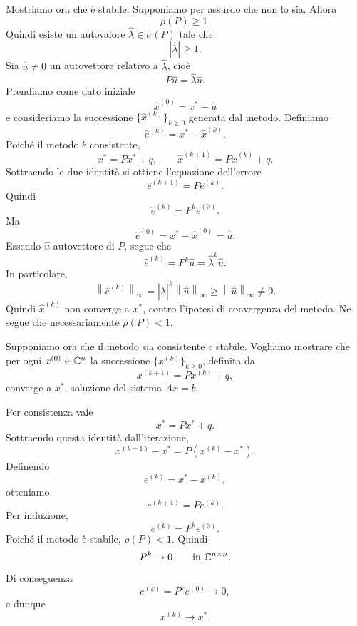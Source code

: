\documentclass[a4paper]{article}
\newcommand{\norm}[1]{\left\lVert#1\right\rVert}
\begin{document}
\begin{snippetproof}{}
\begin{iffproof}
        Mostriamo ora che è stabile. Supponiamo per assurdo che non lo sia. Allora
        \[
            \rho(P)\geq 1.
        \]
        Quindi esiste un autovalore \(\widehat{\lambda}\in\sigma(P)\) tale che
        \[
            |\widehat{\lambda}|\geq 1.
        \]
        Sia \(\widehat{u}\neq 0\) un autovettore relativo a \(\widehat{\lambda}\), cioè
        \[
            P\widehat{u}=\widehat{\lambda}\widehat{u}.
        \]
        Prendiamo come dato iniziale
        \[
            \widehat{x}^{(0)}=x^\ast-\widehat{u}
        \]
        e consideriamo la successione \(\{\widehat{x}^{(k)}\}_{k\geq 0}\) generata dal metodo. Definiamo
        \[
            \widehat{e}^{(k)}=x^\ast-\widehat{x}^{(k)}.
        \]
        Poiché il metodo è consistente,
        \[
            x^\ast=Px^\ast+q,
            \qquad
            \widehat{x}^{(k+1)}=P\widehat{x}^{(k)}+q.
        \]
        Sottraendo le due identità si ottiene l'equazione dell'errore
        \[
            \widehat{e}^{(k+1)}=P\widehat{e}^{(k)}.
        \]
        Quindi
        \[
            \widehat{e}^{(k)}
            =
            P^k\widehat{e}^{(0)}.
        \]
        Ma
        \[
            \widehat{e}^{(0)}
            =
            x^\ast-\widehat{x}^{(0)}
            =
            \widehat{u}.
        \]
        Essendo \(\widehat{u}\) autovettore di \(P\), segue che
        \[
            \widehat{e}^{(k)}
            =
            P^k\widehat{u}
            =
            \widehat{\lambda}^k\widehat{u}.
        \]
        In particolare,
        \[
            \norm{\widehat{e}^{(k)}}_\infty
            =
            {|\widehat{\lambda}|}^k\norm{\widehat{u}}_\infty
            \geq
            \norm{\widehat{u}}_\infty
            \neq 0.
        \]
        Quindi \(\widehat{x}^{(k)}\) non converge a \(x^\ast\), contro l'ipotesi di convergenza del metodo.
        Ne segue che necessariamente \(\rho(P)<1\).

    \item Supponiamo ora che il metodo sia consistente e stabile. Vogliamo mostrare che per ogni
        \(x^{(0)}\in\mathbb{C}^n\) la successione \(\{x^{(k)}\}_{k\geq 0}\), definita da
        \[
            x^{(k+1)}=Px^{(k)}+q,
        \]
        converge a \(x^\ast\), soluzione del sistema \(Ax=b\).

        Per consistenza vale
        \[
            x^\ast=Px^\ast+q.
        \]
        Sottraendo questa identità dall'iterazione,
        \[
            x^{(k+1)}-x^\ast
            =
            P\left(x^{(k)}-x^\ast\right).
        \]
        Definendo
        \[
            e^{(k)}=x^\ast-x^{(k)},
        \]
        otteniamo
        \[
            e^{(k+1)}=Pe^{(k)}.
        \]
        Per induzione,
        \[
            e^{(k)}=P^k e^{(0)}.
        \]
        Poiché il metodo è stabile, \(\rho(P)<1\). Quindi
        \[
            P^k\to 0
            \qquad\text{in }\mathbb{C}^{n\times n}.
        \]
        Di conseguenza
        \[
            e^{(k)}=P^k e^{(0)}\to 0,
        \]
        e dunque
        \[
            x^{(k)}\to x^\ast.
        \]
    \end{iffproof}
\end{snippetproof}
\end{document}
